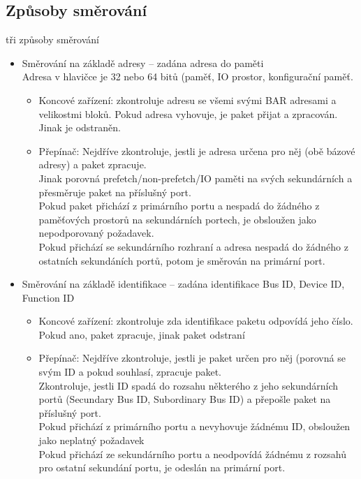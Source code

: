 \documentclass[a4paper, 11pt]{report}
\begin{document}
\subsection{Způsoby směrování}
tři způsoby směrování
\begin{itemize}
	\item Směrování na základě adresy -- zadána adresa do paměti\\
	Adresa v hlavičce je 32 nebo 64 bitů (paměť, IO prostor, konfigurační paměť.
	\begin{itemize}
		\item Koncové zařízení: zkontroluje adresu se všemi svými BAR adresami a velikostmi bloků. Pokud adresa vyhovuje, je paket přijat a zpracován. Jinak je odstraněn.
		\item Přepínač: Nejdříve zkontroluje, jestli je adresa určena pro něj (obě bázové adresy) a paket zpracuje.\\
		Jinak porovná prefetch/non-prefetch/IO paměti na svých sekundárních a přesměruje paket na příslušný port.\\
		Pokud paket přichází z primárního portu a nespadá do žádného z paměťových prostorů na sekundárních portech, je obsloužen jako nepodporovaný požadavek.\\
		Pokud přichází se sekundárního rozhraní a adresa nespadá do žádného z ostatních sekundáních portů, potom je směrován na primární port.
	\end{itemize}
	\item Směrování na základě identifikace -- zadána identifikace Bus ID, Device ID, Function ID\\
	\begin{itemize}
		\item Koncové zařízení: zkontroluje zda identifikace paketu odpovídá jeho číslo. Pokud ano, paket zpracuje, jinak paket odstraní
		\item Přepínač: Nejdříve zkontroluje, jestli je paket určen pro něj (porovná se svým ID a pokud souhlasí, zpracuje paket.\\
		Zkontroluje, jestli ID spadá do rozsahu některého z jeho sekundárních portů (Secundary Bus ID, Subordinary Bus ID) a přepošle paket na příslušný port.\\
		Pokud přichází z primárního portu a nevyhovuje žádnému ID, obsloužen jako neplatný požadavek\\
		Pokud přichází ze sekundárního portu a neodpovídá žádnému z rozsahů pro ostatní sekundání portu, je odeslán na primární port.
	\end{itemize}

\end{itemize}
\end{document}
